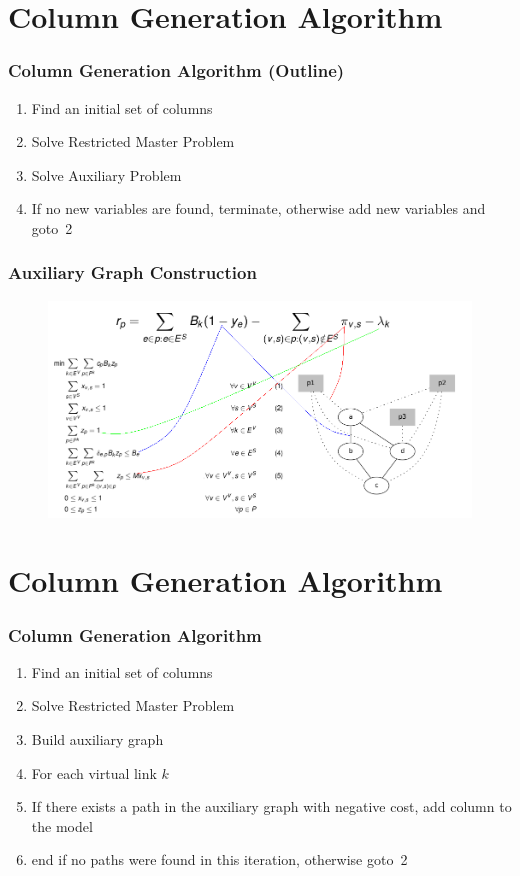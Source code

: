 \documentclass[english]{beamer}
\begin{document}
\section{Column Generation Algorithm}
\begin{frame}
\frametitle{Column Generation Algorithm (Outline)}
\begin{enumerate}
	\item Find an initial set of columns
	\item Solve Restricted Master Problem
	\item Solve Auxiliary Problem
	\item If no new variables are found, terminate, otherwise add new variables and goto~2
\end{enumerate}
\end{frame}
\begin{frame}
\frametitle{Auxiliary Graph Construction}

  \begin{figure}
    \centering
    \includegraphics[scale=0.4]{redcost.png}
  \end{figure}

\end{frame}
\section{Column Generation Algorithm}
\begin{frame}
\frametitle{Column Generation Algorithm}
\begin{enumerate}
	\item Find an initial set of columns
	\item Solve Restricted Master Problem
	\item Build auxiliary graph
	\item For each virtual link $k$
	\item \quad If there exists a path in the auxiliary graph with negative cost, add column to the model
	\item end if no paths were found in this iteration, otherwise goto~2
\end{enumerate}
\end{frame}
\end{document}

